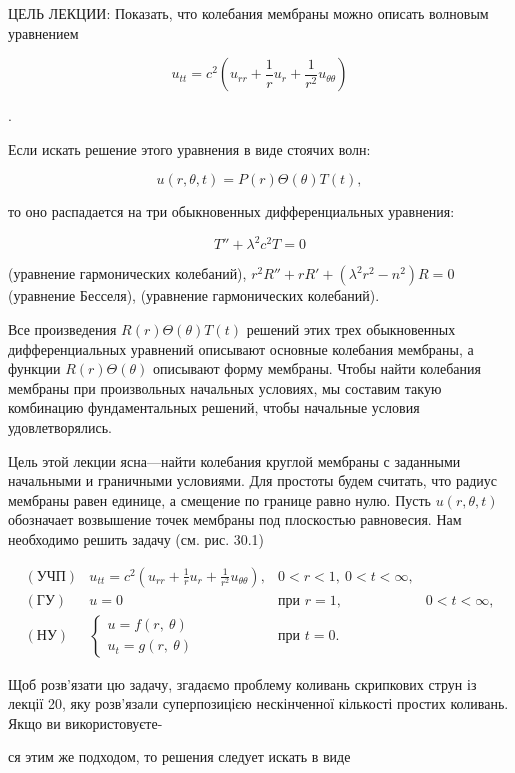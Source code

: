 \documentclass[
  ukrainian,
]{article}
\begin{document}
ЦЕЛЬ ЛЕКЦИИ: Показать, что колебания мембраны можно описать волновым
уравнением

\[
u_{tt} = c^2 \left( u_{rr} + \frac{1}{r} u_r + \frac{1}{r^2} u_{\theta\theta} \right)
\]

.

Если искать решение этого уравнения в виде стоячих волн:

\[
u(r, \theta, t) = P(r) \Theta(\theta) T(t),
\]

то оно распадается на три обыкновенных дифференциальных уравнения:

\[
T'' + \lambda^2 c^2 T = 0
\]

(уравнение гармонических колебаний),
\(r^2 R'' + rR' + (\lambda^2 r^2 - n^2) R = 0\) (уравнение Бесселя),
(уравнение гармонических колебаний).

Все произведения \(R(r) \Theta(\theta) T(t)\) решений этих трех
обыкновенных дифференциальных уравнений описывают основные колебания
мембраны, а функции \(R(r) \Theta(\theta)\) описывают форму мембраны.
Чтобы найти колебания мембраны при произвольных начальных условиях, мы
составим такую комбинацию фундаментальных решений, чтобы начальные
условия удовлетворялись.

Цель этой лекции ясна---найти колебания круглой мембраны с заданными
начальными и граничными условиями. Для простоты будем считать, что
радиус мембраны равен единице, а смещение по границе равно нулю. Пусть
\(u\left(r,\theta,t\right)\) обозначает возвышение точек мембраны под
плоскостью равновесия. Нам необходимо решить задачу (см. рис. 30.1)

\[
\begin{aligned} (\text{УЧП}) & u_{tt} = c^2 \left( u_{rr} + \frac{1}{r} u_r + \frac{1}{r^2} u_{\theta\theta} \right), & 0 < r < 1, \ 0 < t < \infty, \\ (\text{ГУ}) & u = 0 & \text{при } r = 1, & 0 < t < \infty, \\ (\text{НУ}) & \begin{cases} u = f(r, \ \theta) \\ u_t = g(r, \ \theta) \end{cases} & \text{при } t = 0. \end{aligned}
\]

Щоб розв'язати цю задачу, згадаємо проблему коливань скрипкових струн із
лекції 20, яку розв'язали суперпозицією нескінченної кількості простих
коливань. Якщо ви використовуєте-

ся этим же подходом, то решения следует искать в виде
\end{document}
